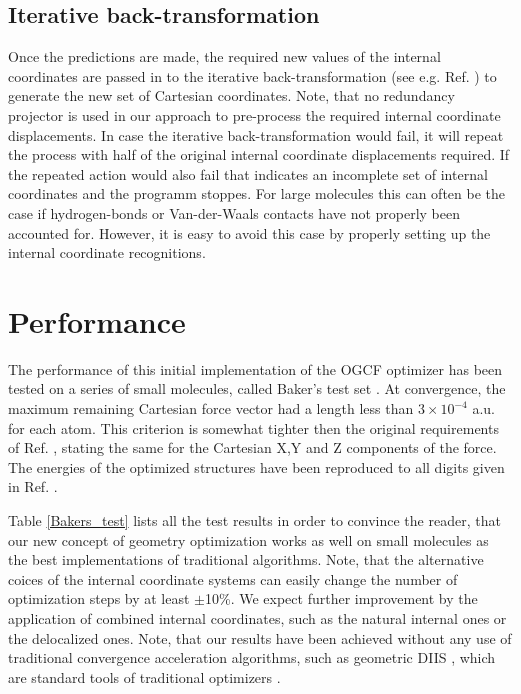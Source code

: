 \documentclass[prl,aps,twocolumn,showpacs,twocolumngrid,superbib]{revtex4}
\begin{document}
\subsection{Iterative back-transformation}
Once the predictions are made, the required new values of the internal
coordinates are passed in to the iterative back-transformation
(see e.g. Ref. \cite{nemeth_coordtrf1})
to generate the new set of Cartesian coordinates. Note, that no
redundancy projector is used in our approach to pre-process the
required internal coordinate displacements. In case the iterative 
back-transformation would fail, it will repeat the process with 
half of the original
internal coordinate displacements required. If the repeated action 
would also fail that indicates an incomplete set of internal coordinates
and the programm stoppes. For large molecules this can often be the case
if hydrogen-bonds or Van-der-Waals contacts have not properly been 
accounted for. However, it is easy to avoid this case by properly 
setting up the internal coordinate recognitions.

\section{Performance}
The performance of this initial implementation of the OGCF optimizer
has been tested on a 
series of small molecules, called Baker's test set \cite{bakerstest}.
At convergence, the maximum remaining Cartesian
force vector had a length less than $3\times10^{-4}$ a.u. for each
atom. This criterion is somewhat tighter then the original requirements
of Ref. \cite{bakerstest}, stating the same for the Cartesian X,Y and Z
components of the force. The energies of the optimized
structures have been reproduced to all digits given in 
Ref. \cite{bakerstest}.

Table \ref{Bakers_test} lists all the test results
in order to convince
the reader, that our new concept of geometry optimization
works as well on small molecules as the best implementations
of traditional algorithms.
Note, that the alternative coices of the
internal coordinate systems can easily change the number
of optimization steps by at least $\pm$10\%.
We expect further improvement by the application of combined    
internal coordinates, such as the natural internal ones or the 
delocalized ones. 
Note, that our results have been achieved without any use
of traditional convergence acceleration algorithms, such as 
geometric DIIS \cite{Pulay_GDIIS}, which are standard tools of
traditional optimizers \cite{Farkas_GDIIS}.
\end{document}
